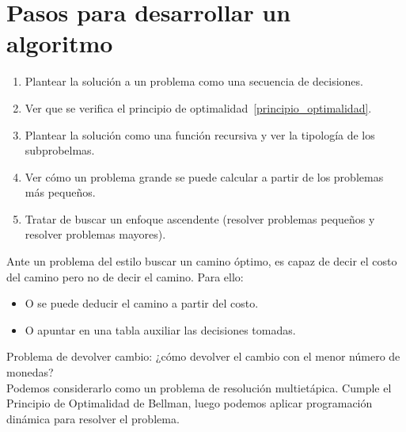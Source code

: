 \section{Pasos para desarrollar un algoritmo}
\begin{enumerate}
    \item Plantear la solución a un problema como una secuencia de decisiones.
    \item Ver que se verifica el principio de optimalidad~\ref{principio_optimalidad}.
    \item Plantear la solución como una función recursiva y ver la tipología de los subprobelmas.
    \item Ver cómo un problema grande se puede calcular a partir de los problemas más pequeños.
    \item Tratar de buscar un enfoque ascendente (resolver problemas pequeños y resolver problemas mayores).
\end{enumerate}
Ante un problema del estilo buscar un camino óptimo, es capaz de decir el costo del camino pero no de decir el camino. Para ello:
\begin{itemize}
    \item O se puede deducir el camino a partir del costo.
    \item O apuntar en una tabla auxiliar las decisiones tomadas.
\end{itemize}

\begin{ejemplo}
    Problema de devolver cambio: ¿cómo devolver el cambio con el menor número de monedas?\\

    Podemos considerarlo como un problema de resolución multietápica. Cumple el Principio de Optimalidad de Bellman, luego podemos aplicar programación dinámica para resolver el problema.

\end{ejemplo}
